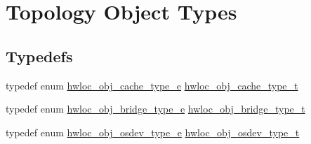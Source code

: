 \hypertarget{a00041}{
\section{Topology Object Types}
\label{a00041}
}
\subsection*{Typedefs}
\begin{DoxyCompactItemize}
\item 
typedef enum \hyperlink{a00041_ga791c9875c8fe20f3e1e5871e0657e59b}{hwloc\_\-obj\_\-cache\_\-type\_\-e} \hyperlink{a00041_gab6e1e7efedae8b341f3ee14fbe53d66c}{hwloc\_\-obj\_\-cache\_\-type\_\-t}
\item 
typedef enum \hyperlink{a00041_ga48a4803c72574191d7ead1c62aaf9860}{hwloc\_\-obj\_\-bridge\_\-type\_\-e} \hyperlink{a00041_ga0a947e8c5adcc729b126bd09c01a0153}{hwloc\_\-obj\_\-bridge\_\-type\_\-t}
\item 
typedef enum \hyperlink{a00041_ga64f5d539df299c97ae80ce53fc4b56c0}{hwloc\_\-obj\_\-osdev\_\-type\_\-e} \hyperlink{a00041_ga90c1e82a60ba5871d07645169e636987}{hwloc\_\-obj\_\-osdev\_\-type\_\-t}
\end{DoxyCompactItemize}
